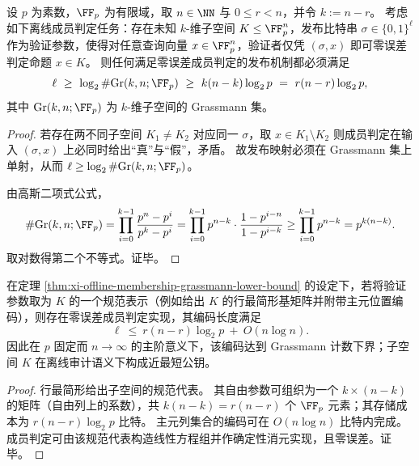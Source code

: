 \begin{theorem}\label{thm:xi-offline-membership-grassmann-lower-bound}
设 \(p\) 为素数，\(\FF_p\) 为有限域，取 \(n\in\NN\) 与 \(0\le r<n\)，并令 \(k:=n-r\)。
考虑如下离线成员判定任务：存在未知 \(k\)-维子空间 \(K\le \FF_p^n\)，发布比特串 \(\sigma\in\{0,1\}^\ell\) 作为验证参数，使得对任意查询向量 \(x\in\FF_p^n\)，验证者仅凭 \((\sigma,x)\) 即可零误差判定命题 \(x\in K\)。
则任何满足零误差成员判定的发布机制都必须满足
\[
\ell\ \ge\ \log_2\#\mathrm{Gr}(k,n;\FF_p)\ \ge\ k(n-k)\log_2 p\ =\ r(n-r)\log_2 p,
\]
其中 \(\mathrm{Gr}(k,n;\FF_p)\) 为 \(k\)-维子空间的 Grassmann 集。
\end{theorem}
\begin{proof}
若存在两不同子空间 \(K_1\neq K_2\) 对应同一 \(\sigma\)，取 \(x\in K_1\setminus K_2\) 则成员判定在输入 \((\sigma,x)\) 上必同时给出“真”与“假”，矛盾。
故发布映射必须在 Grassmann 集上单射，从而 \(\ell\ge \log_2\#\mathrm{Gr}(k,n;\FF_p)\)。
\par
由高斯二项式公式，
\[
\#\mathrm{Gr}(k,n;\FF_p)=\prod_{i=0}^{k-1}\frac{p^n-p^i}{p^k-p^i}
=\prod_{i=0}^{k-1}p^{n-k}\cdot\frac{1-p^{i-n}}{1-p^{i-k}}
\ge \prod_{i=0}^{k-1}p^{n-k}
=p^{k(n-k)}.
\]
取对数得第二个不等式。证毕。
\end{proof}

\begin{corollary}\label{cor:xi-offline-membership-near-optimal-encoding}
在定理 \ref{thm:xi-offline-membership-grassmann-lower-bound} 的设定下，若将验证参数取为 \(K\) 的一个规范表示（例如给出 \(K\) 的行最简形基矩阵并附带主元位置编码），则存在零误差成员判定实现，其编码长度满足
\[
\ell\ \le\ r(n-r)\log_2 p\ +\ O(n\log n).
\]
因此在 \(p\) 固定而 \(n\to\infty\) 的主阶意义下，该编码达到 Grassmann 计数下界；子空间 \(K\) 在离线审计语义下构成近最短公钥。
\end{corollary}


\begin{proof}
行最简形给出子空间的规范代表。
其自由参数可组织为一个 \(k\times(n-k)\) 的矩阵（自由列上的系数），共 \(k(n-k)=r(n-r)\) 个 \(\FF_p\) 元素；其存储成本为 \(r(n-r)\log_2 p\) 比特。
主元列集合的编码可在 \(O(n\log n)\) 比特内完成。
成员判定可由该规范代表构造线性方程组并作确定性消元实现，且零误差。证毕。
\end{proof}

\endinput

